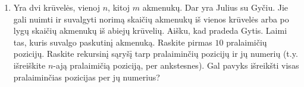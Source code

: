 \begin{enumerate}
  \item \label{it:Wythoff} Yra dvi krūvelės, vienoj $n$, kitoj $m$ akmenukų. Dar yra Julius su Gyčiu.
    Jie gali nuimti ir suvalgyti norimą skaičių akmenukų iš vienos krūvelės arba po lygų
    skaičių akmenukų iš abiejų krūvelių. Aišku, kad pradeda Gytis. Laimi tas, kuris
    suvalgo paskutinį akmenuką. Raskite pirmas $10$ pralaimičių pozicijų. Raskite
    rekursinį sąryšį tarp pralaiminčių pozicijų ir jų numerių (t.y. išreiškite
    $n$-ają pralaimičią poziciją, per ankstesnes). Gal pavyks išreikšti visas
    pralaiminčias pozicijas per jų numerius?

\end{enumerate}
